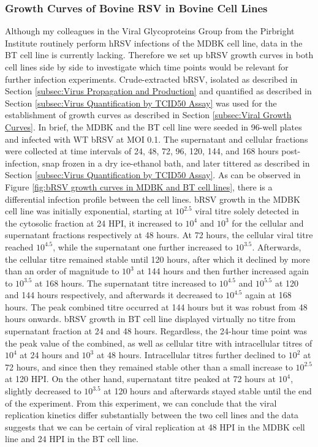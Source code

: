 \subsubsection{Growth Curves of Bovine RSV in Bovine Cell Lines} \label{Growth Curves of Bovine RSV in Bovine Cell Lines}
Although my colleagues in the Viral Glycoproteins Group from the Pirbright Institute routinely perform hRSV infections of the MDBK cell line, data in the BT cell line is currently lacking. Therefore we set up bRSV growth curves in both cell lines side by side to investigate which time points would be relevant for further infection experiments. Crude-extracted bRSV, isolated as described in Section \ref{subsec:Virus Propagation and Production} and quantified as described in Section \ref{subsec:Virus Quantification by TCID50 Assay} was used for the establishment of growth curves as described in Section \ref{subsec:Viral Growth Curves}. In brief, the MDBK and the BT cell line were seeded in 96-well plates and infected with WT bRSV at MOI 0.1. The supernatant and cellular fractions were collected at time intervals of 24, 48, 72, 96, 120, 144, and 168 hours post-infection, snap frozen in a dry ice-ethanol bath, and later tittered as described in Section \ref{subsec:Virus Quantification by TCID50 Assay}. As can be observed in Figure \ref{fig:bRSV growth curves in MDBK and BT cell lines}, there is a differential infection profile between the cell lines. bRSV growth in the MDBK cell line was initially exponential, starting at \(10^{2.5}\) viral titre solely detected in the cytosolic fraction at 24 HPI, it increased to \(10^{4}\) and \(10^{3}\) for the cellular and supernatant fractions respectively at 48 hours. At 72 hours, the cellular viral titre reached \(10^{4.5}\), while the supernatant one further increased to \(10^{3.5}\). Afterwards, the cellular titre remained stable until 120 hours, after which it declined by more than an order of magnitude to \(10^{3}\) at 144 hours and then further increased again to \(10^{3.5}\) at 168 hours. The supernatant titre increased to \(10^{4.5}\) and \(10^{5.5}\) at 120 and 144 hours respectively, and afterwards it decreased to \(10^{4.5}\) again at 168 hours. The peak combined titre occurred at 144 hours but it was robust from 48 hours onwards. bRSV growth in BT cell line displayed virtually no titre from supernatant fraction at 24 and 48 hours. Regardless, the 24-hour time point was the peak value of the combined, as well as cellular titre with intracellular titres of \(10^{4}\) at 24 hours and \(10^{3}\) at 48 hours. Intracellular titres further declined to \(10^{2}\) at 72 hours, and since then they remained stable other than a small increase to \(10^{2.5}\) at 120 HPI. On the other hand, supernatant titre peaked at 72 hours at \(10^{4}\), slightly decreased to \(10^{3.5}\) at 120 hours and afterwards stayed stable until the end of the experiment. From this experiment, we can conclude that the viral replication kinetics differ substantially between the two cell lines and the data suggests that we can be certain of viral replication at 48 HPI in the MDBK cell line and 24 HPI in the BT cell line.

